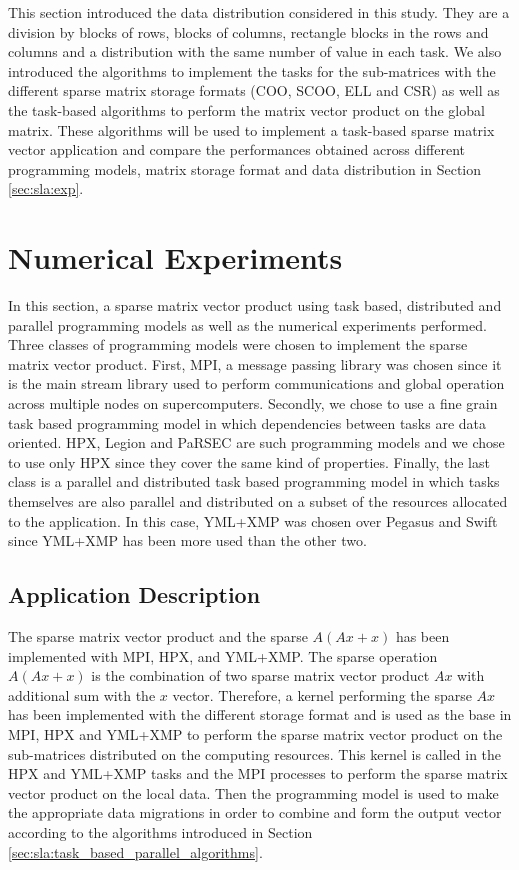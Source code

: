 This section introduced the data distribution considered in this study.
They are a division by blocks of rows, blocks of columns, rectangle blocks in the rows and columns and a distribution with the same number of value in each task.
We also introduced the algorithms to implement the tasks for the sub-matrices with the different sparse matrix storage formats (COO, SCOO, ELL and CSR) as well as the task-based algorithms to perform the matrix vector product on the global matrix.
These algorithms will be used to implement a task-based sparse matrix vector application and compare the performances obtained across different programming models, matrix storage format and data distribution in Section \ref{sec:sla:exp}.

\section{Numerical Experiments \label{sec:sla:exp}}
In this section, a sparse matrix vector product using task based, distributed and parallel programming models as well as the numerical experiments performed.
Three classes of programming models were chosen to implement the sparse matrix vector product.
First, MPI, a message passing library was chosen since it is the main stream library used to perform communications and global operation across multiple nodes on supercomputers.
Secondly, we chose to use a fine grain task based programming model in which dependencies between tasks are data oriented.
HPX, Legion and PaRSEC are such programming models and we chose to use only HPX since they cover the same kind of properties.
Finally, the last class is a parallel and distributed task based programming model in which tasks themselves are also parallel and distributed on a subset of the resources allocated to the application.
In this case, YML+XMP was chosen over Pegasus and Swift since YML+XMP has been more used than the other two.

\subsection{Application Description}
The sparse matrix vector product and the sparse $A(Ax+x)$ has been implemented with MPI, HPX, and YML+XMP.
The sparse operation $A(Ax+x)$ is the combination of two sparse matrix vector product $Ax$ with additional sum with the $x$ vector.
Therefore, a kernel performing the sparse $Ax$ has been implemented with the different storage format and is used as the base in MPI, HPX and YML+XMP to perform the sparse matrix vector product on the sub-matrices distributed on the computing resources.
This kernel is called in the HPX and YML+XMP tasks and the MPI processes to perform the sparse matrix vector product on the local data.
Then the programming model is used to make the appropriate data migrations in order to combine and form the output vector according to the algorithms introduced in Section \ref{sec:sla:task_based_parallel_algorithms}.

